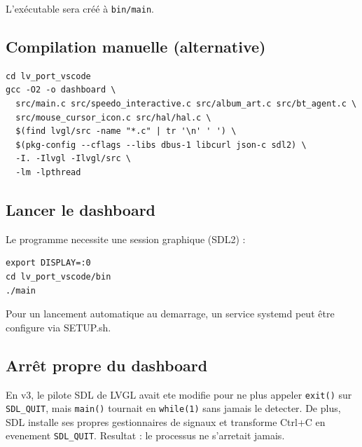 \documentclass[a4paper,11pt]{article}
\begin{document}
L'exécutable sera créé à \texttt{bin/main}.

\subsection{Compilation manuelle (alternative)}

\begin{lstlisting}[style=bashcode]
cd lv_port_vscode
gcc -O2 -o dashboard \
  src/main.c src/speedo_interactive.c src/album_art.c src/bt_agent.c \
  src/mouse_cursor_icon.c src/hal/hal.c \
  $(find lvgl/src -name "*.c" | tr '\n' ' ') \
  $(pkg-config --cflags --libs dbus-1 libcurl json-c sdl2) \
  -I. -Ilvgl -Ilvgl/src \
  -lm -lpthread
\end{lstlisting}

\subsection{Lancer le dashboard}

Le programme necessite une session graphique (SDL2) :

\begin{lstlisting}[style=bashcode]
export DISPLAY=:0
cd lv_port_vscode/bin
./main
\end{lstlisting}

Pour un lancement automatique au demarrage, un service systemd peut être configure
via SETUP.sh.

\subsection{Arrêt propre du dashboard}
\label{sec:arret}

En v3, le pilote SDL de LVGL avait ete modifie pour ne plus appeler \texttt{exit()} sur
\texttt{SDL\_QUIT}, mais \texttt{main()} tournait en \texttt{while(1)} sans jamais le
detecter. De plus, SDL installe ses propres gestionnaires de signaux et transforme
Ctrl+C en evenement \texttt{SDL\_QUIT}. Resultat : le processus ne s'arretait jamais.
\end{document}
